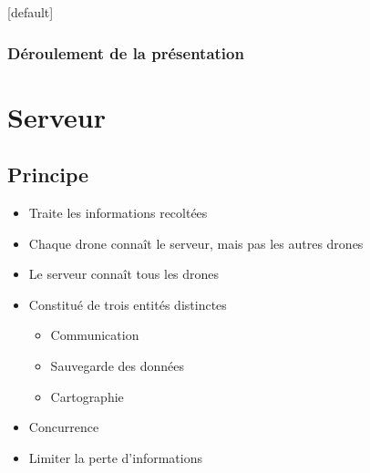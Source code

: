 \documentclass{beamer}
\begin{document}
  {
    \makeatletter
    [default]
    \def\beamer@entrycode{\vspace*{-\headheight}}
    \makeatother
    \begin{frame}
      \frametitle{Déroulement de la présentation}
      \tableofcontents[hidesubsections]
    \end{frame}
  }
  
  {
    \section{Serveur}
      
      \subsection{Principe}
	\begin{frame}
	  \begin{itemize}
	   \item Traite les informations recoltées
	   \item Chaque drone connaît le serveur, mais pas les autres drones
	   \item Le serveur connaît tous les drones
	  \end{itemize}
	\end{frame}
      
	\begin{frame}
	  \begin{itemize}
	    \item Constitué de trois entités distinctes
	    \begin{itemize}
	      \item Communication
	      \item Sauvegarde des données
	      \item Cartographie
	    \end{itemize}
	    \item Concurrence
	    \item Limiter la perte d'informations
	  \end{itemize}
	\end{frame}
	
}
\end{document}
